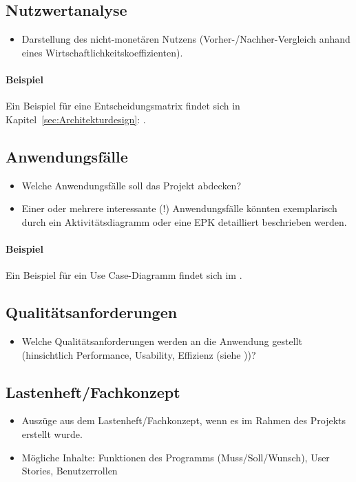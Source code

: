 \subsection{Nutzwertanalyse}
\label{sec:Nutzwertanalyse}
\begin{itemize}
	\item Darstellung des nicht-monetären Nutzens (\zB Vorher-/Nachher-Vergleich anhand eines Wirtschaftlichkeitskoeffizienten). 
\end{itemize}

\paragraph{Beispiel}
Ein Beispiel für eine Entscheidungsmatrix findet sich in Kapitel~\ref{sec:Architekturdesign}: .


\subsection{Anwendungsfälle}
\label{sec:Anwendungsfaelle}
\begin{itemize}
	\item Welche Anwendungsfälle soll das Projekt abdecken?
	\item Einer oder mehrere interessante (!) Anwendungsfälle könnten exemplarisch durch ein Aktivitätsdiagramm oder eine \ac{EPK} detailliert beschrieben werden. 
\end{itemize}

\paragraph{Beispiel}
Ein Beispiel für ein Use Case-Diagramm findet sich im .


\subsection{Qualitätsanforderungen}
\label{sec:Qualitaetsanforderungen}
\begin{itemize}
	\item Welche Qualitätsanforderungen werden an die Anwendung gestellt (\zB hinsichtlich Performance, Usability, Effizienz \etc (siehe \citet{ISO9126}))?
\end{itemize}


\subsection{Lastenheft/Fachkonzept}
\label{sec:Lastenheft}
\begin{itemize}
	\item Auszüge aus dem Lastenheft/Fachkonzept, wenn es im Rahmen des Projekts erstellt wurde.
	\item Mögliche Inhalte: Funktionen des Programms (Muss/Soll/Wunsch), User Stories, Benutzerrollen
\end{itemize}

